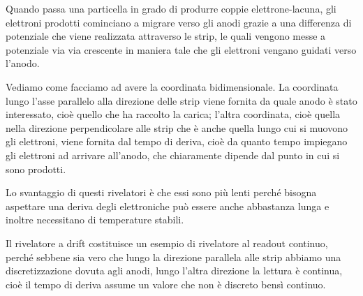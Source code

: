 Quando passa una particella in grado di produrre coppie elettrone-lacuna, gli elettroni prodotti cominciano a migrare verso gli anodi grazie a una differenza di potenziale che viene realizzata attraverso le strip, le quali vengono messe a potenziale via via crescente in maniera tale che gli elettroni vengano guidati verso l'anodo.

Vediamo come facciamo ad avere la coordinata bidimensionale. La coordinata lungo l'asse parallelo alla direzione delle strip viene fornita da quale anodo è stato interessato, cioè quello che ha raccolto la carica; l'altra coordinata, cioè quella nella direzione perpendicolare alle strip che è anche quella lungo cui si muovono gli elettroni, viene fornita dal tempo di deriva, cioè da quanto tempo impiegano gli elettroni ad arrivare all'anodo, che chiaramente dipende dal punto in cui si sono prodotti. 

Lo svantaggio di questi rivelatori è che essi sono più lenti perché bisogna aspettare una deriva degli elettroniche può essere anche abbastanza lunga e inoltre necessitano di temperature stabili.

Il rivelatore a drift costituisce un esempio di rivelatore al readout continuo, perché sebbene sia vero che lungo la direzione parallela alle strip abbiamo una discretizzazione dovuta agli anodi, lungo l'altra direzione la lettura è continua, cioè il tempo di deriva assume un valore che non è discreto bensì continuo.

